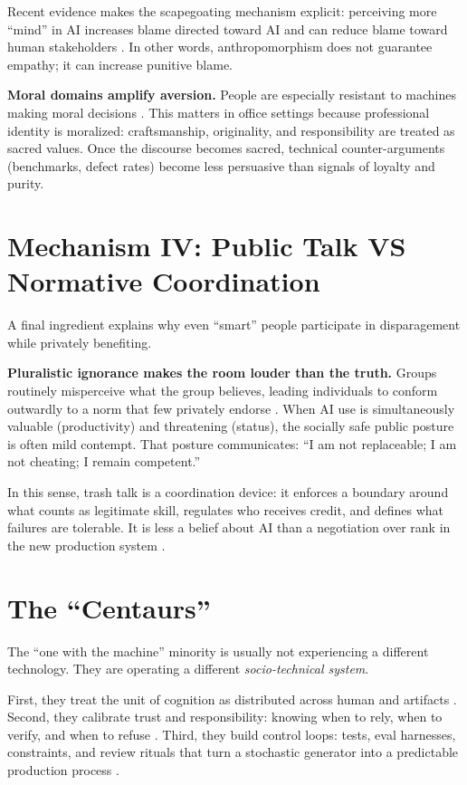 \documentclass[11pt, a4paper, twocolumn]{article} %
\begin{document}
Recent evidence makes the scapegoating mechanism explicit: perceiving more ``mind'' in AI increases blame directed toward AI and can reduce blame toward human stakeholders \citep{Joo2024AIFault}. In other words, anthropomorphism does not guarantee empathy; it can increase punitive blame.

\textbf{Moral domains amplify aversion.} People are especially resistant to machines making moral decisions \citep{BigmanGray2018MoralMachines,Haidt2001Intuition}. This matters in office settings because professional identity is moralized: craftsmanship, originality, and responsibility are treated as sacred values. Once the discourse becomes sacred, technical counter-arguments (benchmarks, defect rates) become less persuasive than signals of loyalty and purity.

\section*{Mechanism IV: Public Talk VS Normative Coordination}

A final ingredient explains why even ``smart'' people participate in disparagement while privately benefiting.

\textbf{Pluralistic ignorance makes the room louder than the truth.} Groups routinely misperceive what the group believes, leading individuals to conform outwardly to a norm that few privately endorse \citep{PrenticeMiller1993Pluralistic}. When AI use is simultaneously valuable (productivity) and threatening (status), the socially safe public posture is often mild contempt. That posture communicates: ``I am not replaceable; I am not cheating; I remain competent.''

In this sense, trash talk is a coordination device: it enforces a boundary around what counts as legitimate skill, regulates who receives credit, and defines what failures are tolerable. It is less a belief about AI than a negotiation over rank in the new production system \citep{AshforthMael1989SocialIdentity,JostBanajiNosek2004Decade}.

\newpage
\section*{The ``Centaurs''}

The ``one with the machine'' minority is usually not experiencing a different technology. They are operating a different \emph{socio-technical system}.

First, they treat the unit of cognition as distributed across human and artifacts \citep{Hutchins2001DistributedCognition}. Second, they calibrate trust and responsibility: knowing when to rely, when to verify, and when to refuse \citep{LeeSee2004TrustAutomation,ParasuramanSheridanWickens2000Levels,HancockEtAl2011TrustMeta,GliksonWoolley2020TrustReview}. Third, they build control loops: tests, eval harnesses, constraints, and review rituals that turn a stochastic generator into a predictable production process \citep{DietvorstSimmonsMassey2018Overcoming}.
\end{document}
